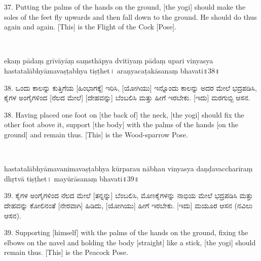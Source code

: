 \begin{eng}
37. Putting the palms of the hands on the ground, [the yogi] should make the soles of the feet fly upwards and then fall down to the ground. He should do thus again and again. [This] is the Flight of the Cock [Pose].
\end{eng}

\newpage

~\vskip 1cm

\dummyimage
\begin{sans}
ekaṃ pādaṃ grīvāyāṃ saṃsthāpya dvitīyaṃ pādaṃ upari vinyasya hastatalābhyāmavaṣṭabhya tiṣṭhet। araṇyacaṭakāsanaṃ bhavati॥38॥
\end{sans}
\bigskip

\begin{kan}
38.	ಒಂದು ಕಾಲನ್ನು ಕುತ್ತಿಗೆಯ [ಹಿಂಭಾಗಕ್ಕೆ] ಇರಿಸಿ, [ಯೋಗಿಯು] ಇನ್ನೊಂದು ಕಾಲನ್ನು ಅದರ ಮೇಲೆ ಭದ್ರಪಡಿಸಿ, ಕೈಗಳ ಅಂಗೈಗಳಿಂದ [ನೆಲದ ಮೇಲೆ] [ದೇಹವನ್ನು] ಬೆಂಬಲಿಸಿ ಮತ್ತು ಹೀಗೆ ಇರಬೇಕು. [ಇದು] ಮರಗುಬ್ಬಿ ಆಸನ.
\end{kan}
\bigskip

\begin{eng}
38. Having placed one foot on [the back of] the neck, [the yogi] should fix the other foot above it, support [the body] with the palms of the hands [on the ground] and remain thus. [This] is the Wood-sparrow Pose.
\end{eng}

\newpage

~\vskip 1cm

\dummyimage
\begin{sans}
hastatalābhyāmavanimavaṣṭabhya kūrparau nābhau vinyasya daṇḍavaccharīraṃ dhṛtvā tiṣṭhet। mayūrāsanaṃ bhavati॥39॥
\end{sans}
\bigskip

\begin{kan}
39.	ಕೈಗಳ ಅಂಗೈಗಳಿಂದ ನೆಲದ ಮೇಲೆ [ತನ್ನನ್ನು] ಬೆಂಬಲಿಸಿ, ಮೊಣಕೈಗಳನ್ನು ನಾಭಿಯ ಮೇಲೆ ಭದ್ರಪಡಿಸಿ ಮತ್ತು ದೇಹವನ್ನು ಕೋಲಿನಂತೆ [ನೇರವಾಗಿ] ಹಿಡಿದು, [ಯೋಗಿಯು] ಹೀಗೆ ಇರಬೇಕು. [ಇದು] ಮಯೂರ ಆಸನ (ನವಿಲು ಆಸನ).
\end{kan}
\bigskip

\begin{eng}
39. Supporting [himself] with the palms of the hands on the ground, fixing the elbows on the navel and holding the body [straight] like a stick, [the yogi] should remain thus. [This] is the Peacock Pose.
\end{eng}

\newpage

~\vskip 1cm

